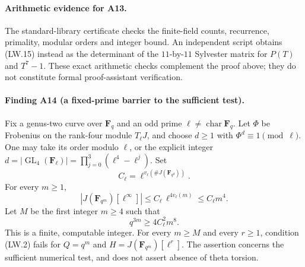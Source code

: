 \documentclass[11pt,a4paper]{article}
\begin{document}
\paragraph{Arithmetic evidence for A13.}
The standard-library certificate
 checks the finite-field
counts, recurrence, primality, modular orders and integer bound.
An independent script
 obtains (LW.15) instead
as the determinant of the $11$-by-$11$ Sylvester matrix for
$P(T)$ and $T^7-1$.  These exact arithmetic checks complement
the proof above; they do not constitute formal proof-assistant
verification.

\paragraph{Finding A14 (a fixed-prime barrier to the sufficient test).}
Fix a genus-two curve over $\mathbf F_q$ and an odd prime
$\ell\ne\operatorname{char}\mathbf F_q$.  Let $\Phi$ be Frobenius on
the rank-four module $T_\ell J$, and choose $d\ge1$ with
$\Phi^d\equiv1\pmod\ell$.  One may take its order modulo $\ell$,
or the explicit integer
$d=|\operatorname{GL}_4(\mathbf F_\ell)|
 =\prod_{j=0}^3(\ell^4-\ell^j)$.
Set
\[
                 C_\ell=\ell^{v_\ell(\#J(\mathbf F_{q^d}))}.
 \tag{LW.18}
\]
For every $m\ge1$,
\[
       |J(\mathbf F_{q^m})[\ell^\infty]|
                    \le C_\ell\,\ell^{4v_\ell(m)}
                    \le C_\ell m^4.
 \tag{LW.19}
\]
Let $M$ be the first integer $m\ge4$ such that
\[
                         q^{3m}\ge4C_\ell^2m^8.
 \tag{LW.20}
\]
This is a finite, computable integer.  For every $m\ge M$ and
every $r\ge1$, condition (LW.2) fails for
$Q=q^m$ and $H=J(\mathbf F_{q^m})[\ell^r]$.
The assertion concerns the sufficient numerical test, and does
not assert absence of theta torsion.
\end{document}
